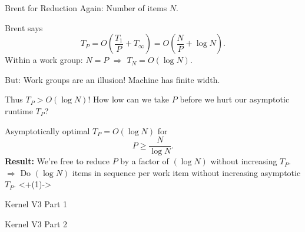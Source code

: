 \documentclass[english,compress]{beamer}
\begin{document}
\begin{frame}{Brent for Reduction}
  Again: Number of items $N$.

  \medskip
  Brent says
  \[
    T_P = O\left( \frac {T_1} P + T_\infty\right)
    = O\left( \frac N P + \log N\right).
  \]
  Within a work group: $N=P$ $\Rightarrow$ $T_N=O(\log N)$.

  \pause
  \bigskip
  But: Work groups are an illusion! Machine has finite width.

  Thus $T_P > O(\log N)$! How low can we take $P$ before we hurt
  our asymptotic runtime $T_P$?

  \pause
  \medskip
  Asymptotically optimal $T_P=O(\log N)$ for
  \[
  P \ge \frac N {\log N}.
  \]
  \textbf{Result:} We're free to reduce $P$ by a factor of $(\log N)$
  without increasing $T_P$. $\Rightarrow$ Do $(\log N)$ items in
  sequence per work item without increasing asymptotic $T_P$.
  \uncover<+(1)->{
  }
\end{frame}
\begin{frame}{Kernel V3 Part 1}
  
\end{frame}
\begin{frame}{Kernel V3 Part 2}
  
\end{frame}
\end{document}
